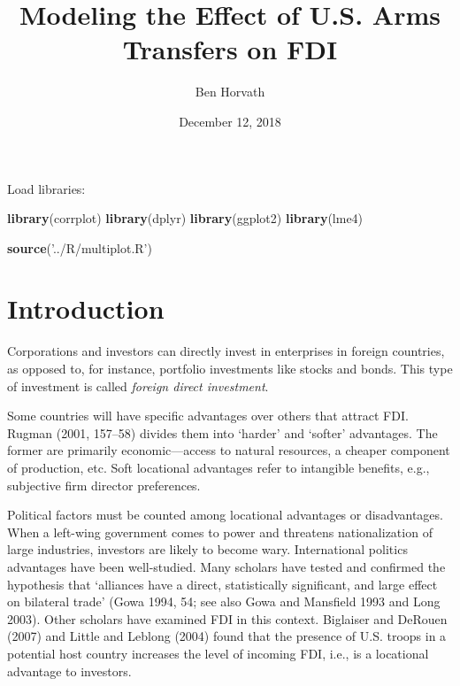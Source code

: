\documentclass[11pt,]{article}
\title{Modeling the Effect of U.S. Arms Transfers on FDI}
\author{Ben Horvath}
\date{December 12, 2018}
\newenvironment{Shaded}{\begin{snugshade}}{\end{snugshade}}
\newcommand{\KeywordTok}[1]{\textcolor[rgb]{0.13,0.29,0.53}{\textbf{#1}}}
\newcommand{\NormalTok}[1]{#1}
\newcommand{\StringTok}[1]{\textcolor[rgb]{0.31,0.60,0.02}{#1}}
\begin{document}
\maketitle

{
\setcounter{tocdepth}{2}
\tableofcontents
}
Load libraries:

\begin{Shaded}
\begin{Highlighting}[]
\KeywordTok{library}\NormalTok{(corrplot)}
\KeywordTok{library}\NormalTok{(dplyr)}
\KeywordTok{library}\NormalTok{(ggplot2)}
\KeywordTok{library}\NormalTok{(lme4)}

\KeywordTok{source}\NormalTok{(}\StringTok{'../R/multiplot.R'}\NormalTok{)}
\end{Highlighting}
\end{Shaded}

\hypertarget{introduction}{%
\section{Introduction}\label{introduction}}

Corporations and investors can directly invest in enterprises in foreign
countries, as opposed to, for instance, portfolio investments like
stocks and bonds. This type of investment is called \emph{foreign direct
investment}.

Some countries will have specific advantages over others that attract
FDI. Rugman (2001, 157--58) divides them into `harder' and `softer'
advantages. The former are primarily economic---access to natural
resources, a cheaper component of production, etc. Soft locational
advantages refer to intangible benefits, e.g., subjective firm director
preferences.

Political factors must be counted among locational advantages or
disadvantages. When a left-wing government comes to power and threatens
nationalization of large industries, investors are likely to become
wary. International politics advantages have been well-studied. Many
scholars have tested and confirmed the hypothesis that `alliances have a
direct, statistically significant, and large effect on bilateral trade'
(Gowa 1994, 54; see also Gowa and Mansfield 1993 and Long 2003). Other
scholars have examined FDI in this context. Biglaiser and DeRouen (2007)
and Little and Leblong (2004) found that the presence of U.S. troops in
a potential host country increases the level of incoming FDI, i.e., is a
locational advantage to investors.
\end{document}
